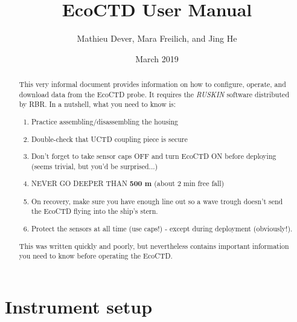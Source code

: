 \documentclass[13pt]{article}
\title{EcoCTD User Manual}
\author{Mathieu Dever, Mara Freilich, and Jing He}
\date{March 2019}
\newcommand{\ruskin}{\textit{RUSKIN }}
\begin{document}
\maketitle

\begin{abstract}
    This very informal document provides information on how to configure, operate, and download data from the EcoCTD probe. It requires the \ruskin software distributed by RBR. In a nutshell, what you need to know is:
    \begin{enumerate}
        \item Practice assembling/disassembling the housing
        \item Double-check that UCTD coupling piece is secure
        \item Don't forget to take sensor caps OFF and turn EcoCTD ON before deploying (seems trivial, but you'd be surprised...)
        \item NEVER GO DEEPER THAN \textbf{500 m} (about 2 min free fall)
        \item On recovery, make sure you have enough line out so a wave trough doesn't send the EcoCTD flying into the ship's stern.
        \item Protect the sensors at all time (use caps!) - except during deployment (obviously!).
    \end{enumerate}
    
    This was written quickly and poorly, but nevertheless contains important information you need to know before operating the EcoCTD.
\end{abstract}

\vfill
\hline 
\tableofcontents
\hline 

\pagebreak
\section{Instrument setup}
\end{document}
